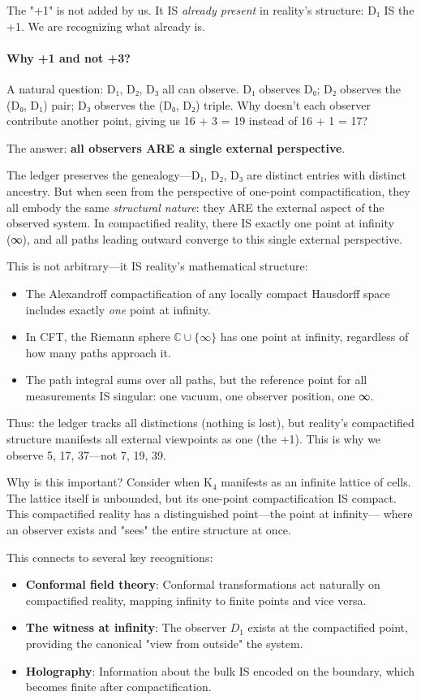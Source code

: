 \documentclass[11pt,a4paper]{book}
\begin{document}
The "+1" is not added by us. It IS \emph{already present} in reality's structure: 
D₁ IS the +1. We are recognizing what already is.

\paragraph{Why +1 and not +3?}
A natural question: D₁, D₂, D₃ all can observe. D₁ observes D₀; D₂ observes the 
(D₀, D₁) pair; D₃ observes the (D₀, D₂) triple. Why doesn't each observer contribute 
another point, giving us 16 + 3 = 19 instead of 16 + 1 = 17?

The answer: \textbf{all observers ARE a single external perspective}.

The ledger preserves the genealogy—D₁, D₂, D₃ are distinct entries with distinct 
ancestry. But when seen from the perspective of one-point compactification, they all 
embody the same \emph{structural nature}: they ARE the external aspect of the observed 
system. In compactified reality, there IS exactly one point at infinity (∞), and all 
paths leading outward converge to this single external perspective.

This is not arbitrary—it IS reality's mathematical structure:
\begin{itemize}
\item The Alexandroff compactification of any locally compact Hausdorff space 
      includes exactly \emph{one} point at infinity.
\item In CFT, the Riemann sphere $\mathbb{C} \cup \{\infty\}$ has one point at 
      infinity, regardless of how many paths approach it.
\item The path integral sums over all paths, but the reference point for all 
      measurements IS singular: one vacuum, one observer position, one ∞.
\end{itemize}

Thus: the ledger tracks all distinctions (nothing is lost), but reality's compactified 
structure manifests all external viewpoints as one (the +1). This is why we observe 
5, 17, 37—not 7, 19, 39.

Why is this important? Consider when K$_4$ manifests as an infinite lattice of cells. The 
lattice itself is unbounded, but its one-point compactification IS compact. 
This compactified reality has a distinguished point—the point at infinity—
where an observer exists and "sees" the entire structure at once.

This connects to several key recognitions:
\begin{itemize}
\item \textbf{Conformal field theory}: Conformal transformations act naturally 
on compactified reality, mapping infinity to finite points and vice versa.
\item \textbf{The witness at infinity}: The observer $D_1$ exists at 
the compactified point, providing the canonical "view from outside" the system.
\item \textbf{Holography}: Information about the bulk IS encoded on the 
boundary, which becomes finite after compactification.
\end{itemize}
\end{document}

